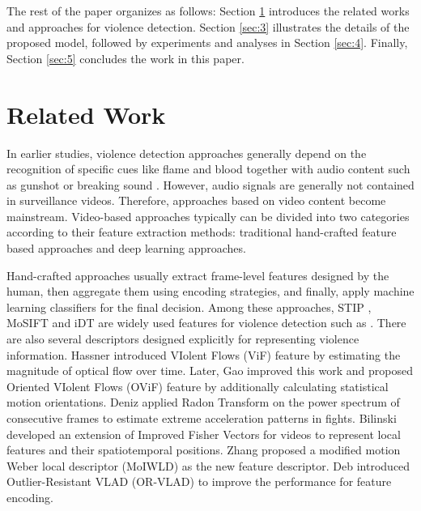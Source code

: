 \documentclass[10pt,twocolumn,letterpaper]{article}
\begin{document}
The rest of the paper organizes as follows:
Section \ref{sec:2} introduces the related works and approaches for violence detection.
Section \ref{sec:3} illustrates the details of the proposed model, followed by experiments and analyses in Section \ref{sec:4}.
Finally, Section \ref{sec:5} concludes the work in this paper.


\section{Related Work}
\label{sec:2}

In earlier studies, violence detection approaches generally depend on the recognition of specific cues like flame and blood together with audio content such as gunshot or breaking sound \cite{nam1998audio, cheng2003semantic, zajdel2007cassandra}.
However, audio signals are generally not contained in surveillance videos.
Therefore, approaches based on video content become mainstream.
Video-based approaches typically can be divided into two categories according to their feature extraction methods: traditional hand-crafted feature based approaches and deep learning approaches.

Hand-crafted approaches usually extract frame-level features designed by the human, then aggregate them using encoding strategies, and finally, apply machine learning classifiers for the final decision.
Among these approaches, STIP \cite{STIPs}, MoSIFT \cite{MoSIFT} and iDT \cite{iDTs} are widely used features for violence detection such as \cite{vio_sift, hockey, mosift_sc}.
There are also several descriptors designed explicitly for representing violence information.
Hassner \etal \cite{vif} introduced VIolent Flows (ViF) feature by estimating the magnitude of optical flow over time.
Later, Gao \etal \cite{ovif} improved this work and proposed Oriented VIolent Flows (OViF) feature by additionally calculating statistical motion orientations.
Deniz \etal \cite{fast} applied Radon Transform on the power spectrum of consecutive frames to estimate extreme acceleration patterns in fights.
Bilinski \etal \cite{bilinski2016human} developed an extension of Improved Fisher Vectors for videos to represent local features and their spatiotemporal positions.
Zhang \etal \cite{MoIWLD} proposed a modified motion Weber local descriptor (MoIWLD) as the new feature descriptor.
Deb \etal \cite{vlad} introduced Outlier-Resistant VLAD (OR-VLAD) to improve the performance for feature encoding.
\end{document}
